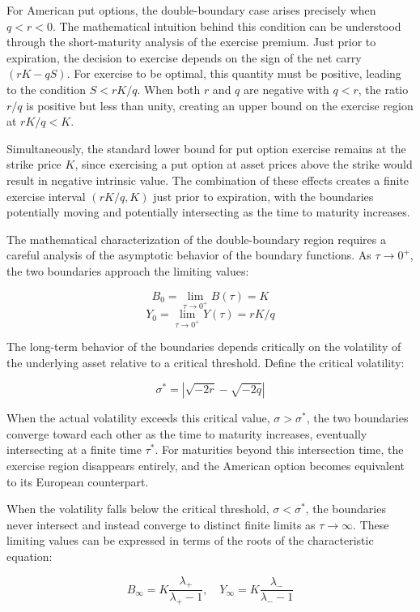 \documentclass[
  american,
  11pt,
  11pt,
  letterpaper,
  onecolumn]{article}
\begin{document}
For American put options, the double-boundary case arises precisely when
\(q < r < 0\). The mathematical intuition behind this condition can be
understood through the short-maturity analysis of the exercise premium.
Just prior to expiration, the decision to exercise depends on the sign
of the net carry \((rK - qS)\). For exercise to be optimal, this
quantity must be positive, leading to the condition \(S < rK/q\). When
both \(r\) and \(q\) are negative with \(q < r\), the ratio \(r/q\) is
positive but less than unity, creating an upper bound on the exercise
region at \(rK/q < K\).

Simultaneously, the standard lower bound for put option exercise remains
at the strike price \(K\), since exercising a put option at asset prices
above the strike would result in negative intrinsic value. The
combination of these effects creates a finite exercise interval
\((rK/q, K)\) just prior to expiration, with the boundaries potentially
moving and potentially intersecting as the time to maturity increases.

The mathematical characterization of the double-boundary region requires
a careful analysis of the asymptotic behavior of the boundary functions.
As \(\tau \to 0^+\), the two boundaries approach the limiting values:

\[B_0 = \lim_{\tau \to 0^+} B(\tau) = K\]
\[Y_0 = \lim_{\tau \to 0^+} Y(\tau) = rK/q\]

The long-term behavior of the boundaries depends critically on the
volatility of the underlying asset relative to a critical threshold.
Define the critical volatility:

\[\sigma^* = \left|\sqrt{-2r} - \sqrt{-2q}\right|\]

When the actual volatility exceeds this critical value,
\(\sigma > \sigma^*\), the two boundaries converge toward each other as
the time to maturity increases, eventually intersecting at a finite time
\(\tau^*\). For maturities beyond this intersection time, the exercise
region disappears entirely, and the American option becomes equivalent
to its European counterpart.

When the volatility falls below the critical threshold,
\(\sigma < \sigma^*\), the boundaries never intersect and instead
converge to distinct finite limits as \(\tau \to \infty\). These
limiting values can be expressed in terms of the roots of the
characteristic equation:

\[B_\infty = K \frac{\lambda_+}{\lambda_+ - 1}, \quad Y_\infty = K \frac{\lambda_-}{\lambda_- - 1}\]
\end{document}
